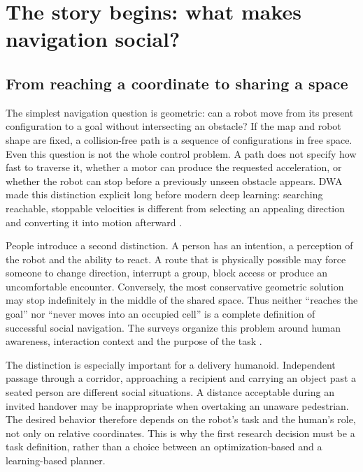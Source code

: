 \section{The story begins: what makes navigation social?}
\label{sec:fundamentals}

\subsection{From reaching a coordinate to sharing a space}
The simplest navigation question is geometric: can a robot move from its present
configuration to a goal without intersecting an obstacle? If the map and robot
shape are fixed, a collision-free path is a sequence of configurations in free
space. Even this question is not the whole control problem. A path does not specify
how fast to traverse it, whether a motor can produce the requested acceleration,
or whether the robot can stop before a previously unseen obstacle appears.
DWA made this distinction explicit long before modern deep learning: searching
reachable, stoppable velocities is different from selecting an appealing direction
and converting it into motion afterward \citep{dwa}.

People introduce a second distinction. A person has an intention, a perception of
the robot and the ability to react. A route that is physically possible may force
someone to change direction, interrupt a group, block access or produce an
uncomfortable encounter. Conversely, the most conservative geometric solution may
stop indefinitely in the middle of the shared space. Thus neither ``reaches the
goal'' nor ``never moves into an occupied cell'' is a complete definition of
successful social navigation. The surveys organize this problem around human
awareness, interaction context and the purpose of the task
\citep{survey2013,survey2024}.

The distinction is especially important for a delivery humanoid. Independent
passage through a corridor, approaching a recipient and carrying an object past
a seated person are different social situations. A distance acceptable during an
invited handover may be inappropriate when overtaking an unaware pedestrian.
The desired behavior therefore depends on the robot's task and the human's role,
not only on relative coordinates. This is why the first research decision must
be a task definition, rather than a choice between an optimization-based and a
learning-based planner.

